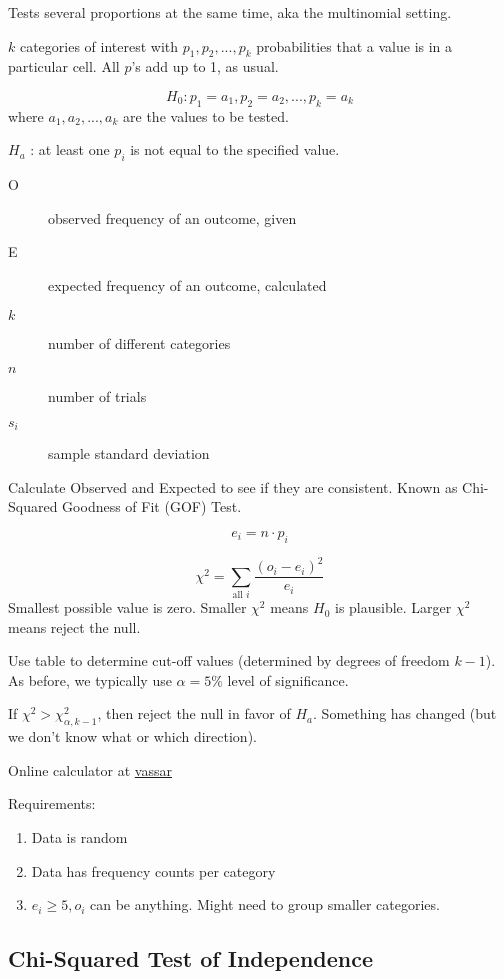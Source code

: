 \documentclass[11pt, oneside]{article}   	%
\begin{document}
Tests several proportions at the same time, aka the multinomial setting.

$k$ categories of interest with $p_1, p_2, ... , p_k$ probabilities that a value is in a particular cell. All $p$'s add up to 1, as usual.

\[
H_0 : p_1 = a_1, p_2 = a_2, ... , p_k = a_k
\]
where $a_1, a_2, ... , a_k$ are the values to be tested.

$H_a$ : at least one $p_i$ is not equal to the specified value.

 \begin{description}
 \item [O] observed frequency of an outcome, given
 \item[E] expected frequency of an outcome, calculated
 \item[$k$]number of different categories
 \item[$n$]number of trials
 \item[$s_i$]sample standard deviation
 \end{description}

Calculate Observed and Expected to see if they are consistent. Known as Chi-Squared Goodness of Fit (GOF) Test.

\[
e_i = n \cdot p_i
\]

\[
\chi^2 = \sum\limits_{\text{all } i} \frac{  (o_i - e_i) ^2} {e_i}
\]
Smallest possible value is zero. Smaller $\chi^2$ means $H_0$ is plausible. Larger $\chi^2$ means reject the null. 

Use table to determine cut-off values (determined by degrees of freedom $k-1$). As before, we typically use $\alpha = 5\%$ level of significance.

If $\chi^2 > \chi_{\alpha, k-1}^2$, then reject the null in favor of $H_a$. Something has changed (but we don't know what or which direction).

Online calculator at \href{http://faculty.vassar.edu/lowry/csfit.html}{vassar}

Requirements:
\begin{enumerate}
\item{Data is random}
\item{Data has frequency counts per category}
\item{$e_i \geq 5, o_i$ can be anything. Might need to group smaller categories.}
\end{enumerate}



\subsection{Chi-Squared Test of Independence}
\end{document}

